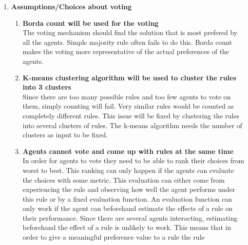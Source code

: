 \documentclass[a4paper]{article}
\begin{document}
\begin{enumerate}
\begin{enumerate}
					 \end{enumerate}
					 
\item \textbf{Assumptions/Choices  about voting} \begin{enumerate}
                                         \item \textbf{Borda count will be used for the voting} \\
                                         The voting mechanism should find the solution that is most prefered by all 
                                         the agents. Simple majority rule often fails to do this. Borda count makes the 
                                         voting more representative of the actual preferences of the agents. 
                                         \item \textbf{K-means clustering algorithm will be used to cluster the 
                                         rules into 3 clusters} \\
                                         Since there are too many possible rules and too few agents to vote on them, simply 
                                         counting will fail. Very similar rules would be counted as completely different rules. 
                                         This issue will be fixed by clustering the rules into several clusters of rules. 
                                         The k-means algorithm needs  the number of clusters as input to be fixed.
                                         \item \textbf{Agents cannot vote and come up with rules at the same time} \\
                                         In order for agents to vote they need to be able to rank their choices from worst 
                                         to best. This ranking can only happen if the agents can evaluate the choices with 
                                         some metric. This evaluation can either come from experiencing the rule and 
                                         observing how well the agent performs under this rule or by a fixed evaluation 
                                         function. An evaluation function can only work if the agent can beforehand 
                                         estimate the effects of a rule on their performance. Since there are several 
                                         agents interacting, estimating beforehand the effect of a rule is unlikely to work. 
                                         This means that in order to give a meaningful preference value to a rule the rule 

\end{enumerate}
\end{enumerate}
\end{document}
